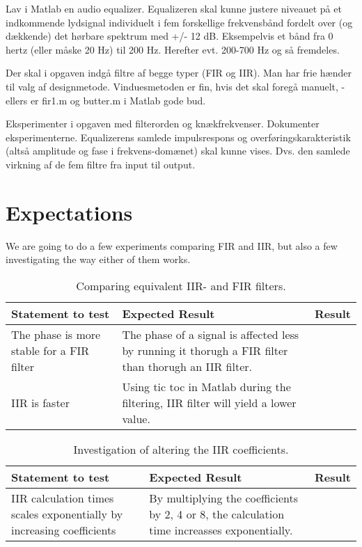 Lav i Matlab en audio equalizer. Equalizeren skal kunne justere niveauet på et indkommende lydsignal individuelt i fem forskellige frekvensbånd fordelt over (og dækkende) det hørbare spektrum med +/- 12 dB. Eksempelvis et bånd fra 0 hertz (eller måske 20 Hz) til 200 Hz. Herefter evt. 200-700 Hz og så fremdeles.

Der skal i opgaven indgå filtre af begge typer (FIR og IIR). Man har frie hænder til valg af designmetode. Vinduesmetoden er fin, hvis det skal foregå manuelt, - ellers er fir1.m og butter.m i Matlab gode bud.

Eksperimenter i opgaven med filterorden og knækfrekvenser. Dokumenter eksperimenterne. Equalizerens samlede impulsrespons og overføringskarakteristik (altså amplitude og fase i frekvens-domænet) skal kunne vises. Dvs. den samlede virkning af de fem filtre fra input til output.

\section{Expectations}
We are going to do a few experiments comparing FIR and IIR, but also a few investigating the way either of them works.

\begin{table}
	\caption{Comparing equivalent IIR- and FIR filters.}
	\label{tab:IIRvsFIR}
	\begin{tabularx}{\textwidth}{X X X}
		Statement to test	& Expected Result	& Result \\
		\toprule
		The phase is more stable for a FIR filter & The phase of a signal is affected less by running it thorugh a FIR filter than thorugh an IIR filter. & \\
		IIR is faster		& Using tic toc in Matlab during the filtering, IIR filter will yield a lower value. & \\
	\end{tabularx}
\end{table}

\begin{table}
	\caption{Investigation of altering the IIR coefficients.}
	\label{tab:IIRtest}
	\begin{tabularx}{\textwidth}{X X X}
		Statement to test	& Expected Result	& Result \\
		\toprule
		IIR calculation times scales exponentially by increasing coefficients & By multiplying the coefficients by 2, 4 or 8, the calculation time increasses exponentially. & \\
	\end{tabularx}
\end{table}